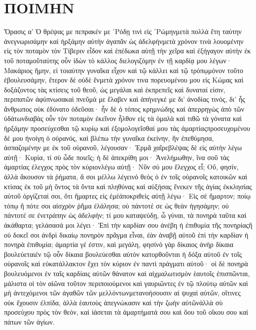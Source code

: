 \section{ΠΟΙΜΗΝ}
Ὅρασις α’
Ὁ θρέψας με πεπρακέν με ῾Ρόδῃ τινὶ εἰς ῾Ρώμηνμετὰ πολλὰ ἔτη ταύτην ἀνεγνωρισάμην καὶ ἠρξάμην αὐτὴν ἀγαπᾶν ὡς ἀδελφήνμετὰ χρόνον τινὰ λουομένην εἰς τὸν ποταμὸν τὸν Τίβεριν εἶδον καὶ ἐπέδωκα αὐτῇ τὴν χεῖρα καὶ ἐξήγαγον αὐτὴν ἐκ τοῦ ποταμοῦταύτης οὖν ἰδὼν τὸ κάλλος διελογιζόμην ἐν τῇ καρδίᾳ μου λέγων· Μακάριος ἤμην, εἰ τοιαύτην γυναῖκα εἶχον καὶ τῷ κάλλει καὶ τῷ τρόπῳμόνον τοῦτο ἐβουλευσάμην, ἕτερον δὲ οὐδὲ ἕνμετὰ χρόνον τινα πορευομένου μου εἰς Κώμας καὶ δοξάζοντος τὰς κτίσεις τοῦ θεοῦ, ὡς μεγάλαι καὶ ἐκπρεπεῖς καὶ δυναταί εἰσιν, περιπατῶν ἀφύπνωσακαὶ πνεῦμά με ἔλαβεν καὶ ἀπήνεγκέ με δι’ ἀνοδίας τινός, δι’ ἧς ἄνθρωπος οὐκ ἐδύνατο ὁδεῦσαι· ἧν δὲ ὁ τόπος κρημνώδης καὶ ἀπερρηγὼς ἀπὸ τῶν ὑδάτωνδιαβὰς οὖν τὸν ποταμὸν ἐκεῖνον ἦλθον εἰς τὰ ὁμαλὰ καὶ τιθῶ τὰ γόνατα καὶ ἠρξάμην προσεύχεσθαι τῷ κυρίῳ καὶ ἐξομολογεῖσθαί μου τὰς ἁμαρτίαςπροσευχομένου δέ μου ἠνοίγη ὁ οὐρανός, καὶ βλέπω τὴν γυναῖκα ἐκείνην, ἣν ἐπεθύμησα, ἀσπαζομένην με ἐκ τοῦ οὐρανοῦ, λέγουσαν· Ἑρμᾶ χαῖρεβλέψας δὲ εἰς αὐτὴν λέγω αὐτῇ· Κυρία, τί σὺ ὧδε ποιεῖς; ἡ δὲ ἀπεκρίθη μοι· Ἀνελήμωθην, ἵνα σοῦ τὰς ἁμαρτίας ἐλεγχος πρὸς τὸν κύριονλέγω αὐτῇ· Νῦν σύ μου ἔλεγχος εἶ; Οὔ, φησίν, ἀλλὰ ἄκουσον τὰ ῥήματα, ἅ σοι μέλλω λέγεινὁ θεὸς ὁ ἐν τοῖς οὐρανοῖς κατοικῶν καὶ κτίσας ἐκ τοῦ μὴ ὄντος τὰ ὄντα καὶ πληθύνας καὶ αὐξήσας ἕνεκεν τῆς ἁγίας ἐκκλησίας αὐτοῦ ὀργίζεταί σοι, ὅτι ἥμαρτες εἰς ἐμέἀποκριθεὶς αὐτῇ λέγω· Εἰς σὲ ἥμαρτον; ποίῳ τόπῳ ἢ πότε σοι αἰσχρὸν ῥῆμα ἐλάλησα; οὐ πάντοτέ σε ὡς θεὰν ἡγησάμην; οὐ πάντοτέ σε ἐνετράπην ὡς ἀδελφήν; τί μου καταψεύδῃ, ὦ γύναι, τὰ πονηρὰ ταῦτα καὶ ἀκάθαρτα; γελάσασά μοι λέγει· Ἐπὶ τὴν καρδίαν σου ἀνέβη ἡ ἐπιθυμία τῆς πονηρίαςἢ οὐ δοκεῖ σοι ἀνδρὶ δικαίῳ πονηρὸν πρᾶγμα εἶναι, ἐὰν ἀναβῇ αὐτοῦ ἐπὶ τὴν καρδίαν ἡ πονηρὰ ἐπιθυμία; ἁμαρτία γέ ἐστιν, καὶ μεγάλη, φησίνὁ γὰρ δίκαιος ἀνὴρ δίκαια βουλεύεταιἐν τῷ οὖν δίκαια βουλεύεσθαι αὐτὸν κατορθοῦνται ἡ δόξα αὐτοῦ ἐν τοῖς οὐρανοῖς καὶ εὐκατάλλακτον ἔχει τὸν κύριον ἐν παντὶ πράγματι αὐτοῦ· οἱ δὲ πονηρὰ βουλευόμενοι ἐν ταῖς καρδίαις αὐτῶν θάνατον καὶ αἰχμαλωτισμὸν ἑαυτοῖς ἐπισπῶνται, μάλιστα οἱ τὸν αἰῶνα τοῦτον περιποιούμενοι καὶ γαυριῶντες ἐν τῷ πλούτῳ αὐτῶν καὶ μὴ ἀντεχόμενοι τῶν ἀγαθῶν τῶν μελλόντωνμετανοήσουσιν αἱ ψυχαὶ αὐτῶν, οἵτινες οὐκ ἔχουσιν ἐλπίδα, ἀλλὰ ἑαυτοὺς ἀπεγνώκασιν καὶ τὴν ζωὴν αὐτῶνἀλλὰ σὺ προσεύχου πρὸς τὸν θεόν, καὶ ἰάσεται τὰ ἁμαρτήματά σου καὶ ὅου τοῦ οἴκου σου καὶ πάτων τῶν ἁγίων.
